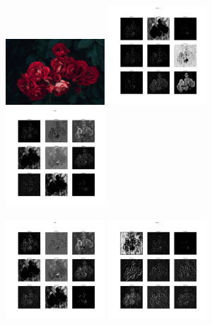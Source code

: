 \documentclass{article}
\begin{document}
{{        \begin{figure}[htp]
            \begin{overprint}
                \includegraphics[width=0.33\textwidth]{Assignment-12/rose.jpg}
                \includegraphics[width=0.33\textwidth]{Assignment-12/fig-1.jpg}
                \includegraphics[width=0.33\textwidth]{Assignment-12/fig-2.jpg}
            \end{overprint}
            \begin{overprint}
                \includegraphics[width=0.33\textwidth]{Assignment-12/fig-3.jpg}
                \includegraphics[width=0.33\textwidth]{Assignment-12/fig-4.jpg}

\end{overprint}
\end{figure}}}
\end{document}

